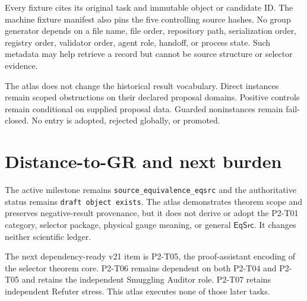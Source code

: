 \documentclass[11pt]{article}
\newcommand{\Eqs}{\mathsf{EqSrc}}
\begin{document}
Every fixture cites its original task and immutable object or candidate ID.
The machine fixture manifest also pins the five controlling source hashes.
No group generator depends on a file name, file order, repository path,
serialization order, registry order, validator order, agent role, handoff, or
process state. Such metadata may help retrieve a record but cannot be source
structure or selector evidence.

The atlas does not change the historical result vocabulary. Direct instances
remain scoped obstructions on their declared proposal domains. Positive
controls remain conditional on supplied proposal data. Guarded noninstances
remain fail-closed. No entry is adopted, rejected globally, or promoted.

\section{Distance-to-GR and next burden}

The active milestone remains \texttt{source\_equivalence\_eqsrc} and the
authoritative status remains \texttt{draft object exists}. The atlas
demonstrates theorem scope and preserves negative-result provenance, but it
does not derive or adopt the P2-T01 category, selector package, physical gauge
meaning, or general \(\Eqs\). It changes neither scientific ledger.

The next dependency-ready v21 item is P2-T05, the proof-assistant encoding of
the selector theorem core. P2-T06 remains dependent on both P2-T04 and P2-T05
and retains the independent Smuggling Auditor role. P2-T07 retains independent
Refuter stress. This atlas executes none of those later tasks.
\end{document}

